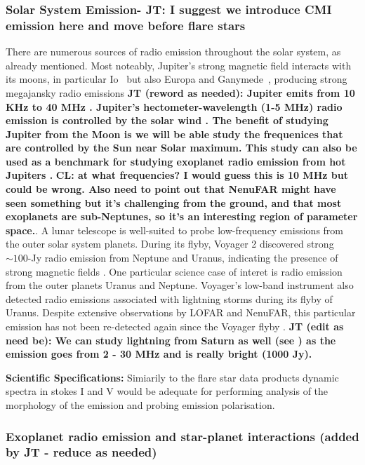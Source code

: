 \subsubsection{Solar System Emission- \textbf{JT: I suggest we introduce CMI emission here and move before flare stars}} 
There are numerous sources of radio emission throughout the solar system, as already mentioned. Most noteably, Jupiter's strong magnetic field interacts with its moons, in particular Io~\citep{Io} but also Europa and Ganymede~\citep{Corentin}, producing strong megajansky radio emissions \textbf{JT (reword as needed): Jupiter emits from 10 KHz to 40 MHz \citep{zarka_auroral_1998}. Jupiter’s hectometer-wavelength (1-5 MHz) radio emission is controlled by the solar wind \citep{Desch1984}. The benefit of studying Jupiter from the Moon is we will be able study the frequenices that are controlled by the Sun near Solar maximum. This study can also be used as a benchmark for studying exoplanet radio emission from hot Jupiters \citep{Zarka2007,joe_nature_review}. } \textbf{CL: at what frequencies? I would guess this is 10 MHz but could be wrong. Also need to point out that NenuFAR might have seen something but it's challenging from the ground, and that most exoplanets are sub-Neptunes, so it's an interesting region of parameter space.}. A lunar telescope is well-suited to probe low-frequency emissions from the outer solar system planets. During its flyby, Voyager 2 discovered strong $\sim 100$-Jy radio emission from Neptune and Uranus, indicating the presence of strong magnetic fields \citep{zarka_auroral_1998, ZHANG199237}. One particular science case of interet is radio emission from the outer planets Uranus and Neptune. Voyager’s low-band instrument also detected radio emissions associated with lightning storms during its flyby of Uranus. Despite extensive observations by LOFAR and NenuFAR, this particular emission has not been re-detected again since the Voyager flyby \citep{1986Zarka_Emission}. \textbf{JT (edit as need be): We can study lightning from Saturn as well (see \citealt{Zarka2004}) as the emission goes from 2 - 30 MHz and is really bright (1000 Jy). }

\textbf{Scientific Specifications:} Simiarily to the flare star data products dynamic spectra in stokes I and V would be adequate for performing analysis of the morphology of the emission and probing emission polarisation. 

\subsubsection{Exoplanet radio emission and star-planet interactions (added by JT - reduce as needed)} 


